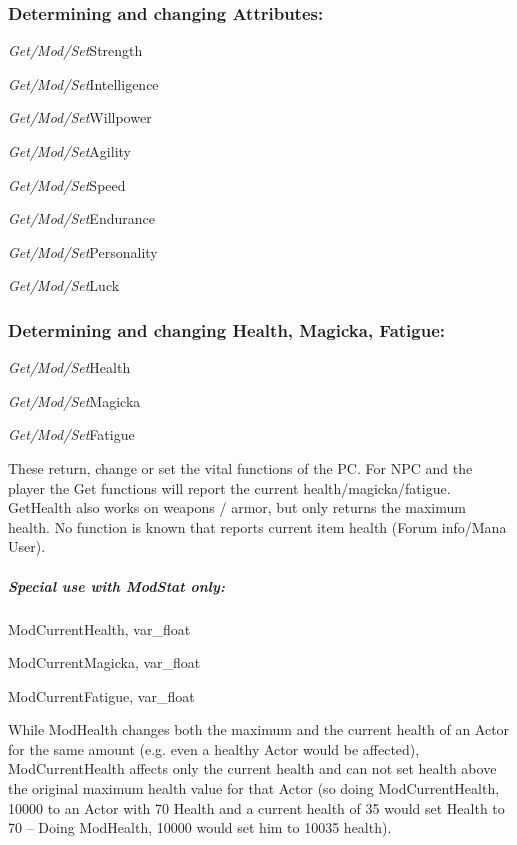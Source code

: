 \documentclass[
]{article}
\begin{document}
\hypertarget{determining-and-changing-attributes}{%
\subsubsection{Determining and changing
Attributes:}\label{determining-and-changing-attributes}}

\emph{Get/Mod/Set}Strength

\emph{Get/Mod/Set}Intelligence

\emph{Get/Mod/Set}Willpower

\emph{Get/Mod/Set}Agility

\emph{Get/Mod/Set}Speed

\emph{Get/Mod/Set}Endurance

\emph{Get/Mod/Set}Personality

\emph{Get/Mod/Set}Luck

\hypertarget{determining-and-changing-health-magicka-fatigue}{%
\subsubsection{Determining and changing Health, Magicka,
Fatigue:}\label{determining-and-changing-health-magicka-fatigue}}

\emph{Get/Mod/Set}Health

\emph{Get/Mod/Set}Magicka

\emph{Get/Mod/Set}Fatigue

These return, change or set the vital functions of the PC. For NPC and
the player the Get functions will report the current
health/magicka/fatigue. GetHealth also works on weapons / armor, but
only returns the maximum health. No function is known that reports
current item health (Forum info/Mana User).

\hypertarget{special-use-with-modstat-only}{%
\subparagraph{\texorpdfstring{Special use with Mod\emph{Stat}
only:}{Special use with ModStat only:}}\label{special-use-with-modstat-only}}

ModCurrentHealth, var\_float

ModCurrentMagicka, var\_float

ModCurrentFatigue, var\_float

While ModHealth changes both the maximum and the current health of an
Actor for the same amount (e.g. even a healthy Actor would be affected),
ModCurrentHealth affects only the current health and can not set health
above the original maximum health value for that Actor (so doing
ModCurrentHealth, 10000 to an Actor with 70 Health and a current health
of 35 would set Health to 70 -- Doing ModHealth, 10000 would set him to
10035 health).
\end{document}
